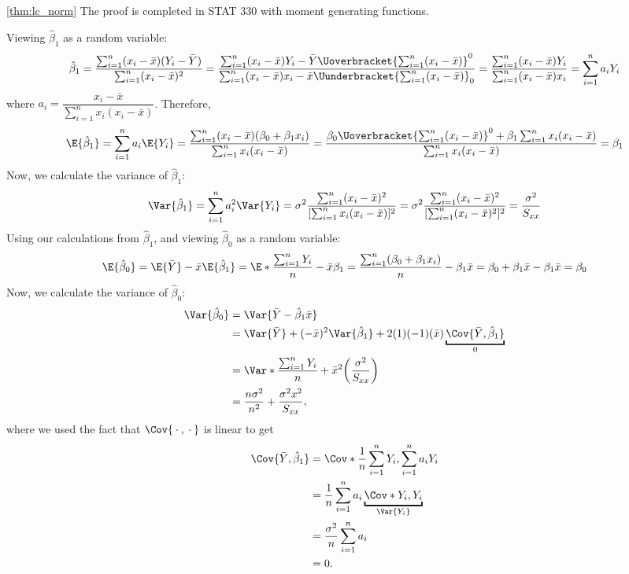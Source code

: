 \begin{Proof}{\ref{thm:lc_norm}}{}
  The proof is completed in STAT 330 with moment generating functions.
\end{Proof}
Viewing $ \hat{\beta}_1 $ as a random variable:
\[ \hat{\beta}_1=\frac{\sum_{i=1}^{n} (x_i-\bar{x})
    (Y_i-\bar{Y})}{
    \sum_{i=1}^{n} (x_i-\bar{x})^2
  }
  =
  \frac{\sum_{i=1}^{n} (x_i-\bar{x})Y_i-
    \bar{Y}\Uoverbracket{\sum_{i=1}^{n} (x_i-\bar{x})}^{0}}{
    \sum_{i=1}^{n} (x_i-\bar{x})x_i-\bar{x}
    \Uunderbracket{\sum_{i=1}^{n} (x_i-\bar{x})}_{0}
  }
  =
  \frac{\sum_{i=1}^{n} (x_i-\bar{x})Y_i}{
    \sum_{i=1}^{n} (x_i-\bar{x})x_i
  }=\sum_{i=1}^{n} a_i Y_i  \]
where $ a_i=\dfrac{x_i-\bar{x}}{\sum_{i=1}^{n} x_i(x_i-\bar{x})}  $.
Therefore,
\[
  \E{\hat{\beta}_1}
  = \sum_{i=1}^{n} a_i\E{Y_i}
  =\frac{\sum_{i=1}^{n}(x_i-\bar{x})(\beta_0+\beta_1x_i)}{
    \sum_{i=1}^{n} x_i(x_i-\bar{x})
  }
  =\frac{\beta_0 \Uoverbracket{\sum_{i=1}^{n}(x_i-\bar{x})}^{0}+
    \beta_1\sum_{i=1}^{n} x_i(x_i-\bar{x})}{
    \sum_{i=1}^{n} x_i(x_i-\bar{x})
  }
  =
  \beta_1
\]
Now, we calculate the variance of $ \hat{\beta}_1 $:
\[
  \Var{\hat{\beta}_1}
  =\sum_{i=1}^{n} a_i^2\Var{Y_i}
  =\sigma^2
  \frac{\sum_{i=1}^{n} (x_i-\bar{x})^2}{
    [\sum_{i=1}^{n} x_i(x_i-\bar{x})]^2
  }
  =\sigma^2 \frac{\sum_{i=1}^{n} (x_i-\bar{x})^2}{
    [\sum_{i=1}^{n} (x_i-\bar{x})^2]^2
  }
  =\frac{\sigma^2}{S_{xx}}
\]
Using our calculations from $ \hat{\beta}_1 $,
and viewing $ \hat{\beta}_0 $ as a random variable:
\[ \E{\hat{\beta}_0}=
  \E{\bar{Y}}-\bar{x}\E{\hat{\beta}_1}=
  \E*{\frac{\sum_{i=1}^{n}Y_i}{n}}-\bar{x}\beta_1=
  \frac{\sum_{i=1}^{n}(\beta_0+\beta_1x_i)}{n}-
  \beta_1\bar{x}=\beta_0+\beta_1\bar{x}-\beta_1\bar{x}=\beta_0
\]
Now, we calculate the variance of $ \hat{\beta}_0 $:
\begin{align*}
  \Var{\hat{\beta}_0}
   & =\Var{\bar{Y}-\hat{\beta}_1\bar{x}}                                                                            \\
   & =\Var{\bar{Y}}+(-\bar{x})^2\Var{\hat{\beta}_1}+2(1)(-1)(\bar{x})\underbracket{\Cov{\bar{Y},\hat{\beta}_1}}_{0} \\
   & =\Var*{\frac{\sum_{i=1}^{n} Y_i}{n}}+\bar{x}^2\biggl( \frac{\sigma^2}{S_{xx}} \biggr)                          \\
   & =\frac{n\sigma^2}{n^2}+\frac{\sigma^2 x^2}{S_{xx}},
\end{align*}
where we used the fact that $ \Cov{\:\cdot\:,\:\cdot\:} $ is linear to get
\begin{align*}
  \Cov{\bar{Y},\hat{\beta}_1}
   & =\Cov*{\frac{1}{n}\sum_{i=1}^{n}Y_i,\sum_{i=1}^{n}a_i Y_i}             \\
   & =\frac{1}{n}\sum_{i=1}^{n}a_i\underbracket{\Cov*{Y_i,Y_i}}_{\Var{Y_i}} \\
   & =\frac{\sigma^2}{n}\sum_{i=1}^{n}a_i                                   \\
   & =0.
\end{align*}
